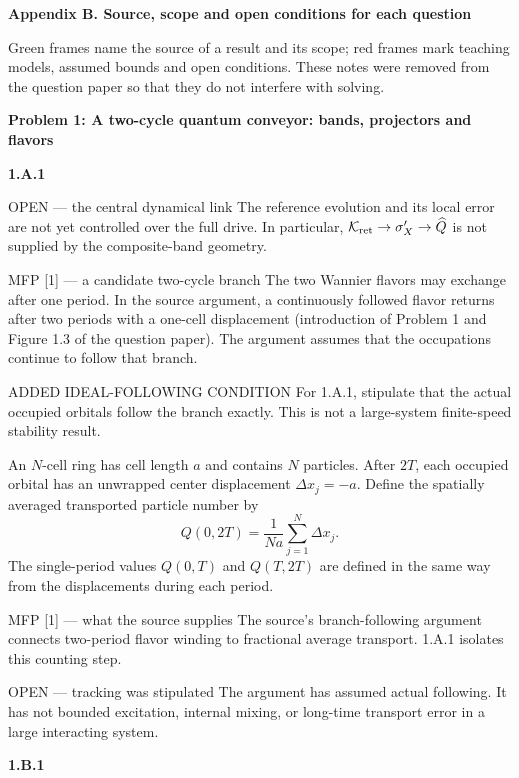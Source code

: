 \documentclass[11pt,a4paper]{article}
\newcommand{\pagetitle}[1]{{\large\bfseries\color{ink}#1}\par\vspace{4pt}}
\newcommand{\smallheading}[1]{\par\Needspace{6\baselineskip}\medskip\textbf{#1}\par}
\begin{document}
\clearpage
\pagetitle{Appendix B. Source, scope and open conditions for each question}
Green frames name the source of a result and its scope; red frames mark teaching models, assumed bounds and open conditions. These notes were removed from the question paper so that they do not interfere with solving.
\smallheading{Problem 1: A two-cycle quantum conveyor: bands, projectors and flavors}
\par\medskip\textbf{1.A.1}\par
\begin{redbox}{OPEN --- the central dynamical link}
The reference evolution and its local error are not yet controlled over the full drive. In particular, $\mathcal K_{\rm ret}\to\sigma'_X\to\widehat Q$ is not supplied by the composite-band geometry.
\end{redbox}
\begin{greenbox}{MFP [1] --- a candidate two-cycle branch}
The two Wannier flavors may exchange after one period. In the source argument, a continuously followed flavor returns after two periods with a one-cell displacement (introduction of Problem 1 and Figure 1.3 of the question paper). The argument assumes that the occupations continue to follow that branch.
\end{greenbox}
\begin{redbox}{ADDED IDEAL-FOLLOWING CONDITION}
For 1.A.1, stipulate that the actual occupied orbitals follow the branch exactly. This is not a large-system finite-speed stability result.

An $N$-cell ring has cell length $a$ and contains $N$ particles. After $2T$, each occupied orbital has an unwrapped center displacement $\Delta x_j=-a$. Define the spatially averaged transported particle number by
\[
Q(0,2T)=\frac{1}{Na}\sum_{j=1}^{N}\Delta x_j.
\]
The single-period values $Q(0,T)$ and $Q(T,2T)$ are defined in the same way from the displacements during each period.
\end{redbox}
\begin{greenbox}{MFP [1] --- what the source supplies}
The source's branch-following argument connects two-period flavor winding to fractional average transport. 1.A.1 isolates this counting step.
\end{greenbox}
\begin{redbox}{OPEN --- tracking was stipulated}
The argument has assumed actual following. It has not bounded excitation, internal mixing, or long-time transport error in a large interacting system.
\end{redbox}
\par\medskip\textbf{1.B.1}\par
\end{document}
